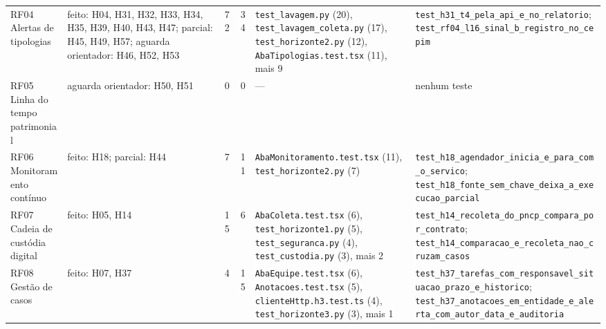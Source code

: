 \begin{scriptsize}
\begin{longtable}{>{\raggedright\arraybackslash}p{2.5cm}>{\raggedright\arraybackslash}p{1.9cm}rr>{\raggedright\arraybackslash}p{3.3cm}>{\raggedright\arraybackslash}p{4.5cm}}
RF04 Alertas de tipologias & feito: H04, H31, H32, H33, H34, H35, H39, H40, H43, H47; parcial: H45, H49, H57; aguarda orientador: H46, H52, H53 & 72 & 34 & \texttt{test\_\allowbreak{}lavagem.\allowbreak{}py} (20), \texttt{test\_\allowbreak{}lavagem\_\allowbreak{}coleta.\allowbreak{}py} (17), \texttt{test\_\allowbreak{}horizonte2.\allowbreak{}py} (12), \texttt{AbaTipologias.\allowbreak{}test.\allowbreak{}tsx} (11), mais 9 & \texttt{test\_\allowbreak{}h31\_\allowbreak{}t4\_\allowbreak{}pela\_\allowbreak{}api\_\allowbreak{}e\_\allowbreak{}no\_\allowbreak{}relatorio}; \texttt{test\_\allowbreak{}rf04\_\allowbreak{}l16\_\allowbreak{}sinal\_\allowbreak{}b\_\allowbreak{}registro\_\allowbreak{}no\_\allowbreak{}cepim} \\
RF05 Linha do tempo patrimonial & aguarda orientador: H50, H51 & 0 & 0 & --- & nenhum teste \\
RF06 Monitoramento contínuo & feito: H18; parcial: H44 & 7 & 11 & \texttt{AbaMonitoramento.\allowbreak{}test.\allowbreak{}tsx} (11), \texttt{test\_\allowbreak{}horizonte2.\allowbreak{}py} (7) & \texttt{test\_\allowbreak{}h18\_\allowbreak{}agendador\_\allowbreak{}inicia\_\allowbreak{}e\_\allowbreak{}para\_\allowbreak{}com\_\allowbreak{}o\_\allowbreak{}servico}; \texttt{test\_\allowbreak{}h18\_\allowbreak{}fonte\_\allowbreak{}sem\_\allowbreak{}chave\_\allowbreak{}deixa\_\allowbreak{}a\_\allowbreak{}execucao\_\allowbreak{}parcial} \\
RF07 Cadeia de custódia digital & feito: H05, H14 & 15 & 6 & \texttt{AbaColeta.\allowbreak{}test.\allowbreak{}tsx} (6), \texttt{test\_\allowbreak{}horizonte1.\allowbreak{}py} (5), \texttt{test\_\allowbreak{}seguranca.\allowbreak{}py} (4), \texttt{test\_\allowbreak{}custodia.\allowbreak{}py} (3), mais 2 & \texttt{test\_\allowbreak{}h14\_\allowbreak{}recoleta\_\allowbreak{}do\_\allowbreak{}pncp\_\allowbreak{}compara\_\allowbreak{}por\_\allowbreak{}contrato}; \texttt{test\_\allowbreak{}h14\_\allowbreak{}comparacao\_\allowbreak{}e\_\allowbreak{}recoleta\_\allowbreak{}nao\_\allowbreak{}cruzam\_\allowbreak{}casos} \\
RF08 Gestão de casos & feito: H07, H37 & 4 & 15 & \texttt{AbaEquipe.\allowbreak{}test.\allowbreak{}tsx} (6), \texttt{Anotacoes.\allowbreak{}test.\allowbreak{}tsx} (5), \texttt{clienteHttp.\allowbreak{}h3.\allowbreak{}test.\allowbreak{}ts} (4), \texttt{test\_\allowbreak{}horizonte3.\allowbreak{}py} (3), mais 1 & \texttt{test\_\allowbreak{}h37\_\allowbreak{}tarefas\_\allowbreak{}com\_\allowbreak{}responsavel\_\allowbreak{}situacao\_\allowbreak{}prazo\_\allowbreak{}e\_\allowbreak{}historico}; \texttt{test\_\allowbreak{}h37\_\allowbreak{}anotacoes\_\allowbreak{}em\_\allowbreak{}entidade\_\allowbreak{}e\_\allowbreak{}alerta\_\allowbreak{}com\_\allowbreak{}autor\_\allowbreak{}data\_\allowbreak{}e\_\allowbreak{}auditoria} \\

\end{longtable}
\end{scriptsize}
